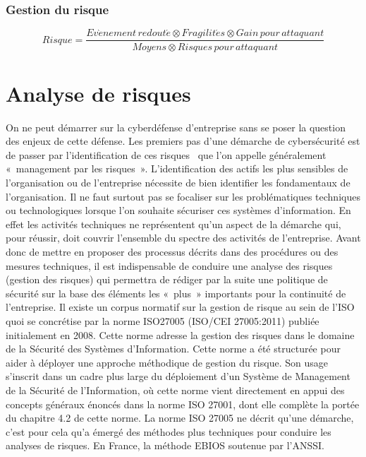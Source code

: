 
\subsubsection{Gestion du risque}


\begin{nota}
\begin{equation}
Risque = \frac{Ev\grave{e}nement\,redout\acute{e}\otimes Fragilit\acute{e}s\otimes Gain\,pour\,attaquant}{Moyens\otimes Risques\,pour\,attaquant}
\end{equation}
\end{nota}


\section{Analyse de risques}

On ne peut démarrer sur la cyberdéfense d’entreprise sans se poser la question des enjeux de cette défense. Les premiers pas d’une démarche de cybersécurité est de passer  par l’identification de ces risques  que l’on appelle généralement « management par les risques ».
L’identification des actifs les plus sensibles de l’organisation ou de l’entreprise nécessite de bien identifier les fondamentaux de l’organisation.
Il ne faut surtout pas se focaliser sur les problématiques techniques ou technologiques lorsque l’on souhaite sécuriser ces systèmes d’information. En effet les activités techniques   ne représentent qu’un aspect de la  démarche qui, pour réussir, doit couvrir l’ensemble du spectre des  activités de l'entreprise.
Avant donc de mettre en proposer des processus décrits dans des procédures ou des mesures techniques, il est indispensable de conduire une analyse des risques (gestion des risques) qui permettra de rédiger par la suite une politique de sécurité sur la base des éléments les « plus » importants pour la continuité de l’entreprise.
Il existe un corpus normatif sur la gestion de risque au sein de l’ISO quoi se concrétise par la norme ISO27005 (ISO/CEI 27005:2011) publiée initialement en 2008. Cette norme adresse la gestion des risques dans le domaine de la Sécurité des Systèmes d'Information.
Cette norme a été structurée pour aider à déployer une approche méthodique de gestion du risque. Son usage s’inscrit dans un cadre plus large du déploiement d’un Système de Management de la Sécurité de l'Information,  où cette norme vient directement en appui des concepts généraux énoncés dans la norme ISO 27001, dont elle complète la portée du chapitre 4.2 de cette norme.
La norme ISO 27005 ne décrit qu'une démarche, c’est pour cela qu’a émergé des méthodes plus techniques pour conduire les analyses de risques. En France, la méthode EBIOS soutenue par l’ANSSI. 

